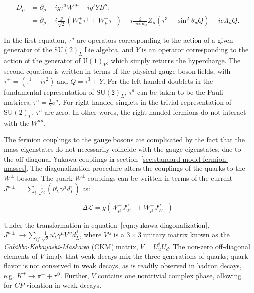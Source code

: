 \begin{align}\label{eqn:covariant-derivative-ew}
	D_{\mu} &= \partial_{\mu} - i g \tau^a W^{a\mu} - i g' Y B^{\mu}, \\
	&= \partial_{\mu} - i \frac{g}{\sqrt{2}}\left(W_{\mu}^+ \tau^+ + W_{\mu}^- \tau^-\right) - i\frac{g}{\cos\theta_w} Z_{\mu}\left(\tau^3 - \sin^2\theta_w Q\right) - i e A_{\mu} Q.
\end{align}

In the first equation, $\tau^a$ are operators corresponding to the action of a given generator of the $\mathrm{SU}(2)_L$ Lie algebra, and $Y$ is an operator corresponding to the action of the generator of $\mathrm{U}(1)_Y$, which simply returns the hypercharge. The second equation is written in terms of the physical gauge boson fields, with $\tau^{\pm}=\left(\tau^1 \pm i \tau^2\right)$ and $Q=\tau^3+Y$. For the left-handed doublets in the fundamental representation of $\mathrm{SU}(2)_L$, $\tau^a$ can be taken to be the Pauli matrices, $\tau^a=\frac12 \sigma^a$. For right-handed singlets in the trivial representation of $\mathrm{SU}(2)_L$, $\tau^a$ are zero. In other words, the right-handed fermions do not interact with the $W^{a\mu}$. 


The fermion couplings to the gauge bosons are complicated by the fact that the mass eigenstates do not necessarily coincide with the gauge eigenstates, due to the off-diagonal Yukawa couplings in section~\ref{sec:standard-model-fermion-masses}. The diagonalization procedure alters the couplings of the quarks to the $W^{\pm}$ bosons. The quark-$W^{\pm}$ couplings can be written in terms of the current $J^{\mu\pm}=\sum_{i} \frac1{\sqrt{2}}\left(\overline{u}_L^i\gamma^{\mu}d_L^i\right)$ as:

\begin{equation}
	\Delta\mathcal{L} = g (W^+_{\mu}J^{\mu+}_W + W^{-}_{\mu}J^{\mu -}_{W})
\end{equation}

Under the transformation in equation~\ref{eqn:yukawa-diagonalization}, $J^{\mu\pm}\rightarrow \sum_{ij}\frac{1}{\sqrt{2}} \overline{u}_L^i \gamma^{\mu} V^{ij} d_L^j$, where $V^{ij}$ is a $3\times 3$ unitary matrix known as the \emph{Cabibbo-Kobayashi-Maskawa} (CKM) matrix, $V = U_{u}^{\dagger} U_d$. The non-zero off-diagonal elements of $V$ imply that weak decays mix the three generations of quarks; quark flavor is not conserved in weak decays, as is readily observed in hadron decays, e.g. $K^{\pm}\rightarrow \pi^{\pm}+\pi^0$. Further, $V$ contains one nontrivial complex phase, allowing for $CP$ violation in weak decays. 

